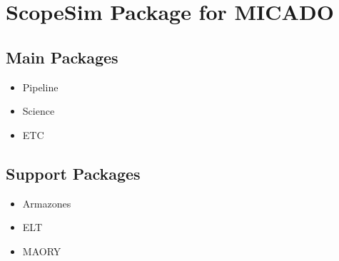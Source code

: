 

\section{ScopeSim Package for MICADO%
  \label{scopesim-package-for-micado}%
}


\subsection{Main Packages%
  \label{main-packages}%
}

\begin{itemize}
\item Pipeline

\item Science

\item ETC
\end{itemize}


\subsection{Support Packages%
  \label{support-packages}%
}

\begin{itemize}
\item Armazones

\item ELT

\item MAORY
\end{itemize}
